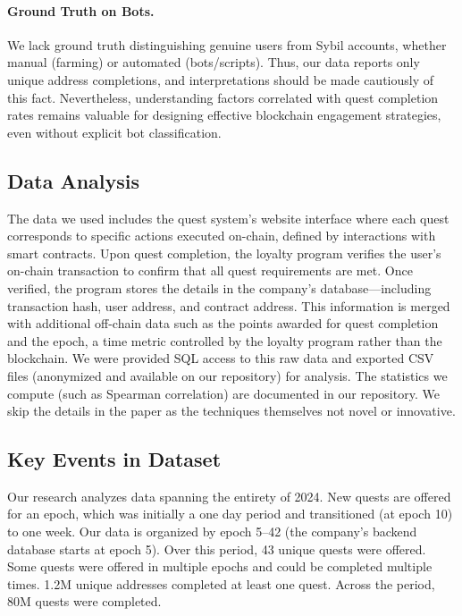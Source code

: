 \paragraph{Ground Truth on Bots.} We lack ground truth distinguishing genuine users from Sybil accounts, whether manual (farming) or automated (bots/scripts). Thus, our data reports only unique address completions, and interpretations should be made cautiously of this fact. Nevertheless, understanding factors correlated with quest completion rates remains valuable for designing effective blockchain engagement strategies, even without explicit bot classification.


\subsection{Data Analysis}

The data we used includes the quest system's website interface where each quest corresponds to specific actions executed on-chain, defined by interactions with smart contracts. Upon quest completion, the loyalty program verifies the user's on-chain transaction to confirm that all quest requirements are met. Once verified, the program stores the details in the company's database—including transaction hash, user address, and contract address. This information is merged with additional off-chain data such as the points awarded for quest completion and the epoch, a time metric controlled by the loyalty program rather than the blockchain. We were provided SQL access to this raw data and exported CSV files (anonymized and available on our repository) for analysis. The statistics we compute (such as Spearman correlation) are documented in our repository. We skip the details in the paper as the techniques themselves not novel or innovative. 


\subsection{Key Events in Dataset}

Our research analyzes data spanning the entirety of 2024. New quests are offered for an epoch, which was initially a one day period and transitioned (at epoch 10) to one week. Our data is organized by epoch 5--42 (the company's backend database starts at epoch 5). Over this period, 43 unique quests were offered. Some quests were offered in multiple epochs and could be completed multiple times. 1.2M unique addresses completed at least one quest.  Across the period, 80M quests were completed.

